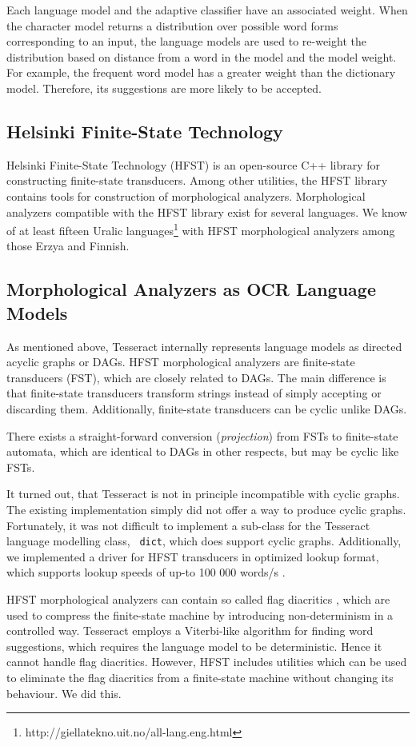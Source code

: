 \documentclass[b5paper]{article}
\begin{document}
Each language model and the adaptive classifier have an associated
weight. When the character model returns a distribution over possible
word forms corresponding to an input, the language models are used to
re-weight the distribution based on distance from a word in the model
and the model weight. For example, the frequent word model has a
greater weight than the dictionary model. Therefore, its suggestions
are more likely to be accepted.

\subsection{Helsinki Finite-State Technology}
Helsinki Finite-State Technology (HFST) \cite{linden13} is an
open-source C++ library for constructing finite-state
transducers. Among other utilities, the HFST library contains tools
for construction of morphological analyzers. Morphological analyzers
compatible with the HFST library exist for several languages. We know
of at least fifteen Uralic
languages\footnote{http://giellatekno.uit.no/all-lang.eng.html} with
HFST morphological analyzers among those Erzya and Finnish.

\subsection{Morphological Analyzers as OCR Language Models}
As mentioned above, Tesseract internally represents language models as
directed acyclic graphs or DAGs. HFST morphological analyzers are
finite-state transducers (FST), which are closely related to DAGs. The
main difference is that finite-state transducers transform strings
instead of simply accepting or discarding them. Additionally,
finite-state transducers can be cyclic unlike DAGs.

There exists a straight-forward conversion ({\it projection})
from FSTs to finite-state automata, which are identical to DAGs in
other respects, but may be cyclic like FSTs. 

It turned out, that Tesseract is not in principle incompatible with
cyclic graphs. The existing implementation simply did not offer a way
to produce cyclic graphs. Fortunately, it was not difficult to
implement a sub-class for the Tesseract language modelling class, {\tt
  dict}, which does support cyclic graphs. Additionally, we
implemented a driver for HFST transducers in optimized lookup format,
which supports lookup speeds of up-to 100 000 words/s
\cite{silfverberg09}.

HFST morphological analyzers can contain so called flag diacritics
\cite{beesley03}, which are used to compress the finite-state machine
by introducing non-determinism in a controlled way. Tesseract employs
a Viterbi-like algorithm for finding word suggestions, which requires
the language model to be deterministic. Hence it cannot handle flag
diacritics. However, HFST includes utilities which can be used to
eliminate the flag diacritics from a finite-state machine without
changing its behaviour. We did this.
\end{document}
